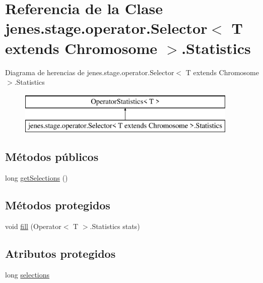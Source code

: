 \hypertarget{classjenes_1_1stage_1_1operator_1_1_selector_3_01_t_01extends_01_chromosome_01_4_1_1_statistics}{\section{Referencia de la Clase jenes.\-stage.\-operator.\-Selector$<$ T extends Chromosome $>$.Statistics}
\label{classjenes_1_1stage_1_1operator_1_1_selector_3_01_t_01extends_01_chromosome_01_4_1_1_statistics}
}
Diagrama de herencias de jenes.\-stage.\-operator.\-Selector$<$ T extends Chromosome $>$.Statistics\begin{figure}[H]
\begin{center}
\leavevmode
\includegraphics[height=2.000000cm]{classjenes_1_1stage_1_1operator_1_1_selector_3_01_t_01extends_01_chromosome_01_4_1_1_statistics}
\end{center}
\end{figure}
\subsection*{Métodos públicos}
\begin{DoxyCompactItemize}
\item 
long \hyperlink{classjenes_1_1stage_1_1operator_1_1_selector_3_01_t_01extends_01_chromosome_01_4_1_1_statistics_a0145f6cec84ff007289d206f579a117a}{get\-Selections} ()
\end{DoxyCompactItemize}
\subsection*{Métodos protegidos}
\begin{DoxyCompactItemize}
\item 
void \hyperlink{classjenes_1_1stage_1_1operator_1_1_selector_3_01_t_01extends_01_chromosome_01_4_1_1_statistics_ab1db0e72568009d65141927f039ffe84}{fill} (Operator$<$ T $>$.Statistics stats)
\end{DoxyCompactItemize}
\subsection*{Atributos protegidos}
\begin{DoxyCompactItemize}
\item 
long \hyperlink{classjenes_1_1stage_1_1operator_1_1_selector_3_01_t_01extends_01_chromosome_01_4_1_1_statistics_a8308f3f0177bfe79fcbf46bd4ac93cc4}{selections}
\end{DoxyCompactItemize}


